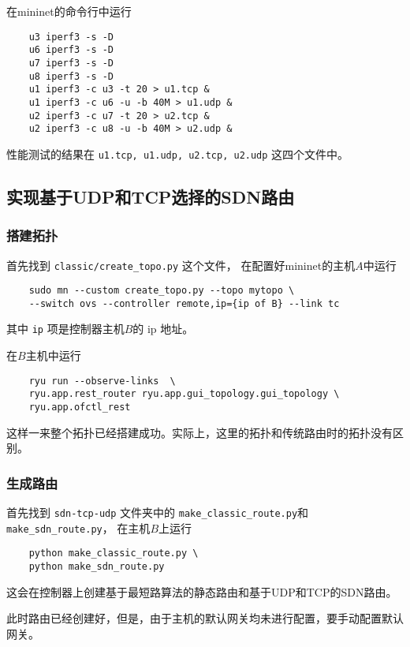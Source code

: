 在mininet的命令行中运行

\begin{lstlisting}
	u3 iperf3 -s -D
	u6 iperf3 -s -D
	u7 iperf3 -s -D
	u8 iperf3 -s -D
	u1 iperf3 -c u3 -t 20 > u1.tcp &
	u1 iperf3 -c u6 -u -b 40M > u1.udp &
	u2 iperf3 -c u7 -t 20 > u2.tcp &
	u2 iperf3 -c u8 -u -b 40M > u2.udp &
\end{lstlisting}

性能测试的结果在 \texttt{u1.tcp, u1.udp, u2.tcp, u2.udp} 这四个文件中。

\subsection{实现基于UDP和TCP选择的SDN路由}

\subsubsection{搭建拓扑}

首先找到 \texttt{classic/create\_{}topo.py} 这个文件，
在配置好mininet的主机$A$中运行
\begin{lstlisting}
	sudo mn --custom create_topo.py --topo mytopo \
	--switch ovs --controller remote,ip={ip of B} --link tc
\end{lstlisting}

其中 \texttt{ip} 项是控制器主机$B$的 ip 地址。

在$B$主机中运行

\begin{lstlisting}
	ryu run --observe-links  \
	ryu.app.rest_router ryu.app.gui_topology.gui_topology \
	ryu.app.ofctl_rest
\end{lstlisting}

这样一来整个拓扑已经搭建成功。实际上，这里的拓扑和传统路由时的拓扑没有区别。

\subsubsection{生成路由}
首先找到 \texttt{sdn-tcp-udp} 文件夹中的 
\texttt{make\_classic\_route.py}和
\texttt{make\_sdn\_route.py}，
在主机$B$上运行

\begin{lstlisting}
	python make_classic_route.py \
	python make_sdn_route.py
\end{lstlisting}

这会在控制器上创建基于最短路算法的静态路由和基于UDP和TCP的SDN路由。

此时路由已经创建好，但是，由于主机的默认网关均未进行配置，要手动配置默认网关。

